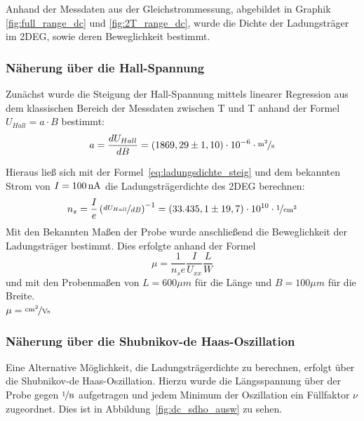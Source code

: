 

Anhand der Messdaten aus der Gleichstrommessung, abgebildet in Graphik \ref{fig:full_range_dc} und \ref{fig:2T_range_dc}, wurde die Dichte der Ladungsträger im 2DEG, sowie deren Beweglichkeit bestimmt.

\subsubsection{Näherung über die Hall-Spannung}
\label{ch:naeherung_hall}

Zunächst wurde die Steigung der Hall-Spannung mittels linearer Regression aus dem klassischen Bereich der Messdaten zwischen \unit[-2]{T} und \unit[2]{T} anhand der Formel $ U_{Hall}=a\cdot B $  
bestimmt:
\begin{equation}
	a=\d{U_{Hall}}{B} = (1869,29 \pm 1,10)\cdot10^{-6} \cdot  \unitfrac{m^2}{s}
\end{equation}

Hieraus ließ sich mit der Formel~\eqref{eq:ladungsdichte_steig} und dem bekannten Strom von $I=\unit[100]{nA}$ die Ladungsträgerdichte des 2DEG berechnen: 
\begin{equation}
	n_s= \frac{I}{e}\left({\niced{U_{Hall}}{B}}\right)^{-1}=( 33.435,1 \pm 19,7) \cdot 10^{10}\cdot \unitfrac{1}{cm^2}
\end{equation}
Mit den Bekannten Maßen der Probe wurde anschließend die Beweglichkeit der Ladungsträger bestimmt. Dies erfolgte anhand der Formel \\
\begin{equation}
	\mu=\frac{1}{n_se}\frac{I}{U_{xx}}\frac{L}{W}
\end{equation}
und mit den Probenmaßen von $L=600\mu m$ für die Länge und $B=100\mu m$ für die Breite. \\

$\mu= \unitfrac{cm^2}{Vs}$  %

\subsubsection{Näherung über die Shubnikov-de Haas-Oszillation}
\label{ch:naeherung_sdho}

Eine Alternative Möglichkeit, die Ladungsträgerdichte zu berechnen, erfolgt über die Shubnikov-de Haas-Oszillation. Hierzu wurde die Längsspannung über der Probe 
 gegen $\unitfrac{1}{B}$ aufgetragen und jedem Minimum der Oszillation ein Füllfaktor $\nu$ zugeordnet. Dies ist in Abbildung~\ref{fig:dc_sdho_ausw} zu sehen. 

